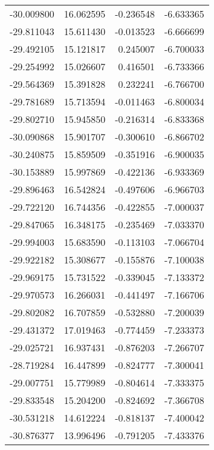 \begin{tabular}{rrrr}
      -30.009800 &        16.062595 &   -0.236548 &  -6.633365 \\
      -29.811043 &        15.611430 &   -0.013523 &  -6.666699 \\
      -29.492105 &        15.121817 &    0.245007 &  -6.700033 \\
      -29.254992 &        15.026607 &    0.416501 &  -6.733366 \\
      -29.564369 &        15.391828 &    0.232241 &  -6.766700 \\
      -29.781689 &        15.713594 &   -0.011463 &  -6.800034 \\
      -29.802710 &        15.945850 &   -0.216314 &  -6.833368 \\
      -30.090868 &        15.901707 &   -0.300610 &  -6.866702 \\
      -30.240875 &        15.859509 &   -0.351916 &  -6.900035 \\
      -30.153889 &        15.997869 &   -0.422136 &  -6.933369 \\
      -29.896463 &        16.542824 &   -0.497606 &  -6.966703 \\
      -29.722120 &        16.744356 &   -0.422855 &  -7.000037 \\
      -29.847065 &        16.348175 &   -0.235469 &  -7.033370 \\
      -29.994003 &        15.683590 &   -0.113103 &  -7.066704 \\
      -29.922182 &        15.308677 &   -0.155876 &  -7.100038 \\
      -29.969175 &        15.731522 &   -0.339045 &  -7.133372 \\
      -29.970573 &        16.266031 &   -0.441497 &  -7.166706 \\
      -29.802082 &        16.707859 &   -0.532880 &  -7.200039 \\
      -29.431372 &        17.019463 &   -0.774459 &  -7.233373 \\
      -29.025721 &        16.937431 &   -0.876203 &  -7.266707 \\
      -28.719284 &        16.447899 &   -0.824777 &  -7.300041 \\
      -29.007751 &        15.779989 &   -0.804614 &  -7.333375 \\
      -29.833548 &        15.204200 &   -0.824692 &  -7.366708 \\
      -30.531218 &        14.612224 &   -0.818137 &  -7.400042 \\
      -30.876377 &        13.996496 &   -0.791205 &  -7.433376 \\

\end{tabular}
